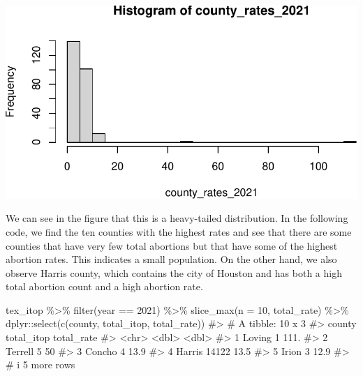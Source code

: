 \documentclass[
  letterpaper,
]{latex/krantz}
\makeatletter
\newenvironment{Shaded}{\begin{snugshade}}{\end{snugshade}}
\newcommand{\AttributeTok}[1]{\textcolor[rgb]{0.40,0.45,0.13}{#1}}
\newcommand{\CommentTok}[1]{\textcolor[rgb]{0.37,0.37,0.37}{#1}}
\newcommand{\DecValTok}[1]{\textcolor[rgb]{0.68,0.00,0.00}{#1}}
\newcommand{\FunctionTok}[1]{\textcolor[rgb]{0.28,0.35,0.67}{#1}}
\newcommand{\NormalTok}[1]{\textcolor[rgb]{0.00,0.23,0.31}{#1}}
\newcommand{\OtherTok}[1]{\textcolor[rgb]{0.00,0.23,0.31}{#1}}
\newcommand{\SpecialCharTok}[1]{\textcolor[rgb]{0.37,0.37,0.37}{#1}}
\newenvironment{kframe}{%
\medskip{}
\setlength{\fboxsep}{.8em}
 \def\at@end@of@kframe{}%
 \ifinner\ifhmode%
  \def\at@end@of@kframe{\end{minipage}}%
  \begin{minipage}{\columnwidth}%
 \fi\fi%
 \def\FrameCommand##1{\hskip\@totalleftmargin \hskip-\fboxsep
 \colorbox{shadecolor}{##1}\hskip-\fboxsep
     \hskip-\linewidth \hskip-\@totalleftmargin \hskip\columnwidth}%
 \MakeFramed {\advance\hsize-\width
   \@totalleftmargin\z@ \linewidth\hsize
   \@setminipage}}%
 {\par\unskip\endMakeFramed%
 \at@end@of@kframe}
\renewenvironment{Shaded}{\begin{kframe}}{\end{kframe}}
\makeatother
\begin{document}
\begin{Shaded}
\end{Shaded}

\begin{center}
\includegraphics[width=1\textwidth,height=\textheight]{book/hypothesis_tests_files/figure-pdf/unnamed-chunk-2-1.pdf}
\end{center}

We can see in the figure that this is a heavy-tailed distribution. In
the following code, we find the ten counties with the highest rates and
see that there are some counties that have very few total abortions but
that have some of the highest abortion rates. This indicates a small
population. On the other hand, we also observe Harris county, which
contains the city of Houston and has both a high total abortion count
and a high abortion rate.

\begin{Shaded}
\begin{Highlighting}[]
\NormalTok{tex\_itop }\SpecialCharTok{\%\textgreater{}\%} 
  \FunctionTok{filter}\NormalTok{(year }\SpecialCharTok{==} \DecValTok{2021}\NormalTok{) }\SpecialCharTok{\%\textgreater{}\%} 
  \FunctionTok{slice\_max}\NormalTok{(}\AttributeTok{n =} \DecValTok{10}\NormalTok{, total\_rate) }\SpecialCharTok{\%\textgreater{}\%}
\NormalTok{  dplyr}\SpecialCharTok{::}\FunctionTok{select}\NormalTok{(}\FunctionTok{c}\NormalTok{(county, total\_itop, total\_rate))}
\CommentTok{\#\textgreater{} \# A tibble: 10 x 3}
\CommentTok{\#\textgreater{}   county  total\_itop total\_rate}
\CommentTok{\#\textgreater{}   \textless{}chr\textgreater{}        \textless{}dbl\textgreater{}      \textless{}dbl\textgreater{}}
\CommentTok{\#\textgreater{} 1 Loving           1      111. }
\CommentTok{\#\textgreater{} 2 Terrell          5       50  }
\CommentTok{\#\textgreater{} 3 Concho           4       13.9}
\CommentTok{\#\textgreater{} 4 Harris       14122       13.5}
\CommentTok{\#\textgreater{} 5 Irion            3       12.9}
\CommentTok{\#\textgreater{} \# i 5 more rows}
\end{Highlighting}
\end{Shaded}
\end{document}
